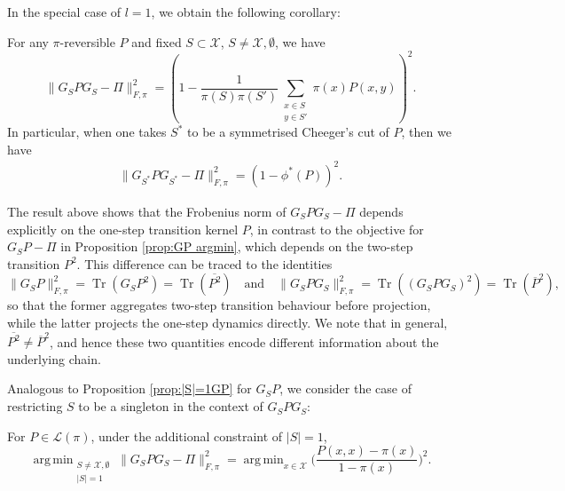 \documentclass[EJP]{ejpecp} %
\DeclareMathOperator{\Tr}{Tr}
\DeclareMathOperator*{\argmin}{arg\,min}
\begin{document}
In the special case of $l = 1$, we obtain the following corollary:
\begin{corollary} \label{cor:GPG frob}
    For any $\pi$-reversible $P$ and fixed $S \subset \mathcal{X}$, $S \neq \mathcal{X}, \emptyset$, we have
    $$\|G_SPG_S - \Pi\|_{F, \pi}^2 = \left(1 - \frac{1}{\pi(S)\pi(S')}\sum_{\substack{x \in S\\ y \in S'}}  \pi(x)P(x,y)\right)^2.$$
    In particular, when one takes $S^*$ to be a symmetrised Cheeger's cut of $P$, then we have
    \begin{align*}
        \|G_{S^*} P G_{S^*} - \Pi\|_{F, \pi}^2 = \left(1 - \phi^*(P)\right)^2.
    \end{align*}
\end{corollary}

The result above shows that the Frobenius norm of $G_S P G_S - \Pi$ depends explicitly on the one-step transition kernel $P$, in contrast to the objective for $G_S P - \Pi$ in Proposition \ref{prop:GP argmin}, which depends on the two-step transition $P^2$. This difference can be traced to the identities
$$\|G_SP\|_{F, \pi}^2 = \Tr(G_S P^2)=\Tr(\overline{P^2}) \quad \text{and} \quad \|G_SPG_S\|_{F, \pi}^2 = \Tr((G_S P G_S)^2)=\Tr\left(\overline{P}^2\right),$$
so that the former aggregates two-step transition behaviour before projection, while the latter projects the one-step dynamics directly. We note that in general, $\overline{P^2}\neq \overline{P}^2$, and hence these two quantities encode different information about the underlying chain.

Analogous to Proposition \ref{prop:|S|=1GP} for $G_S P$, we consider the case of restricting $S$ to be a singleton in the context of $G_S P G_S$:
\begin{corollary}
    For $P \in \mathcal{L}(\pi)$, under the additional constraint of $|S| = 1$, 
    $$\argmin_{\substack{S \neq \mathcal{X}, \emptyset\\ |S|=1}} \|G_SPG_S - \Pi\|_{F, \pi}^2 = \argmin_{x \in \mathcal{X}} \bigg(\frac{P(x,x) - \pi(x)}{1-\pi(x)}\bigg)^2.$$
\end{corollary}
\end{document}
